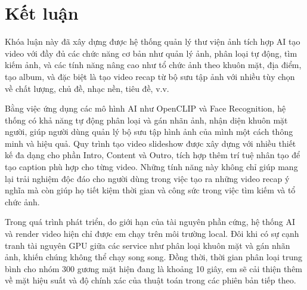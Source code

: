 \chapter*{Kết luận}

Khóa luận này đã xây dựng được hệ thống quản lý thư viện ảnh tích hợp AI tạo video với đầy đủ các chức năng cơ bản như quản lý ảnh, phân loại tự động, tìm kiếm ảnh, và các tính năng nâng cao như tổ chức ảnh theo khuôn mặt, địa điểm, tạo album, và đặc biệt là tạo video recap từ bộ sưu tập ảnh với nhiều tùy chọn về chất lượng, chủ đề, nhạc nền, tiêu đề, v.v.

Bằng việc ứng dụng các mô hình AI như OpenCLIP và Face Recognition, hệ thống có khả năng tự động phân loại và gán nhãn ảnh, nhận diện khuôn mặt người, giúp người dùng quản lý bộ sưu tập hình ảnh của mình một cách thông minh và hiệu quả. Quy trình tạo video slideshow được xây dựng với nhiều thiết kế đa dạng cho phần Intro, Content và Outro, tích hợp thêm trí tuệ nhân tạo để tạo caption phù hợp cho từng video. Những tính năng này không chỉ giúp mang lại trải nghiệm độc đáo cho người dùng trong việc tạo ra những video recap ý nghĩa mà còn giúp họ tiết kiệm thời gian và công sức trong việc tìm kiếm và tổ chức ảnh.

Trong quá trình phát triển, do giới hạn của tài nguyên phần cứng, hệ thống AI và render video hiện chỉ được em chạy trên môi trường local. Đôi khi có sự cạnh tranh tài nguyên GPU giữa các service như phân loại khuôn mặt và gán nhãn ảnh, khiến chúng không thể chạy song song. Đồng thời, thời gian phân loại trung bình cho nhóm 300 gương mặt hiện đang là khoảng 10 giây, em sẽ cải thiện thêm về mặt hiệu suất và độ chính xác của thuật toán trong các phiên bản tiếp theo.